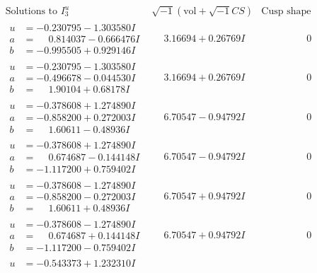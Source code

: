 \documentclass[1p]{elsarticle_modified}
\theoremstyle{definition}
\newcommand{\I}{\sqrt{-1}}
\begin{document}
$$\begin{array}{c|c|c}
\text{Solutions to }I^u_{3}& \I (\text{vol} + \sqrt{-1}CS) & \text{Cusp shape}\\
 \hline 
\begin{aligned}
u &= -0.230795 - 1.303580 I \\
a &= \phantom{-}0.814037 - 0.666476 I \\
b &= -0.995505 + 0.929146 I\end{aligned}
 & \phantom{-}3.16694 + 0.26769 I & \phantom{-0.000000 } 0 \\ \hline\begin{aligned}
u &= -0.230795 - 1.303580 I \\
a &= -0.496678 - 0.044530 I \\
b &= \phantom{-}1.90104 + 0.68178 I\end{aligned}
 & \phantom{-}3.16694 + 0.26769 I & \phantom{-0.000000 } 0 \\ \hline\begin{aligned}
u &= -0.378608 + 1.274890 I \\
a &= -0.858200 + 0.272003 I \\
b &= \phantom{-}1.60611 - 0.48936 I\end{aligned}
 & \phantom{-}6.70547 - 0.94792 I & \phantom{-0.000000 } 0 \\ \hline\begin{aligned}
u &= -0.378608 + 1.274890 I \\
a &= \phantom{-}0.674687 - 0.144148 I \\
b &= -1.117200 + 0.759402 I\end{aligned}
 & \phantom{-}6.70547 - 0.94792 I & \phantom{-0.000000 } 0 \\ \hline\begin{aligned}
u &= -0.378608 - 1.274890 I \\
a &= -0.858200 - 0.272003 I \\
b &= \phantom{-}1.60611 + 0.48936 I\end{aligned}
 & \phantom{-}6.70547 + 0.94792 I & \phantom{-0.000000 } 0 \\ \hline\begin{aligned}
u &= -0.378608 - 1.274890 I \\
a &= \phantom{-}0.674687 + 0.144148 I \\
b &= -1.117200 - 0.759402 I\end{aligned}
 & \phantom{-}6.70547 + 0.94792 I & \phantom{-0.000000 } 0 \\ \hline\begin{aligned}
u &= -0.543373 + 1.232310 I \\

\end{aligned}
\end{array}$$
\end{document}
